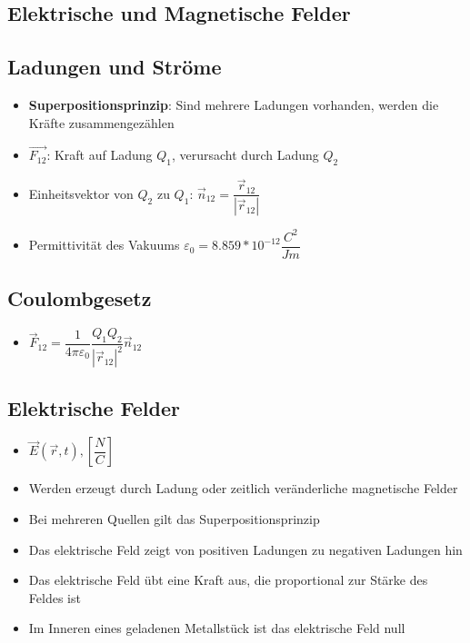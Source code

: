 \documentclass[8pt,a4paper]{scrartcl}
\begin{document}
\begin{multicols*}{3}
		\section{Elektrische und Magnetische Felder}

			\subsection{Ladungen und Ströme}
				\begin{itemize}\itemsep0pt
					\item \textbf{Superpositionsprinzip}: Sind mehrere Ladungen vorhanden, werden die Kräfte zusammengezählen
					\item $\overrightarrow{F_{12}}$: Kraft auf Ladung $Q_{1}$, verursacht durch Ladung $Q_{2}$
					\item Einheitsvektor von $Q_{2}$ zu $Q_{1}$: $\overrightarrow{n}_{12} = \dfrac{\overrightarrow{r}_{12}}{|\overrightarrow{r}_{12}|}$
					\item Permittivität des Vakuums $ \varepsilon_{0}=8.859*10^{-12}\dfrac{C^{2}}{Jm}$
				\end{itemize}
			
			\subsection{Coulombgesetz}
				\begin{itemize}\itemsep0pt
					\item $\overrightarrow{F}_{12}=\dfrac{1}{4\pi\varepsilon_{0}}\dfrac{Q_{1}Q_{2}}{|\overrightarrow{r}_{12}|^{2}}\overrightarrow{n}_{12}$
				\end{itemize}
			
			\subsection{Elektrische Felder}
			
				\begin{itemize}\itemsep0pt
					\item $\overrightarrow{E}(\overrightarrow{r},t), [\dfrac{N}{C}]$
					\item Werden erzeugt durch Ladung oder zeitlich veränderliche magnetische Felder
					\item Bei mehreren Quellen gilt das Superpositionsprinzip
					\item Das elektrische Feld zeigt von positiven Ladungen zu negativen Ladungen hin
					\item Das elektrische Feld übt eine Kraft aus, die proportional zur Stärke des Feldes ist
					\item Im Inneren eines geladenen Metallstück ist das elektrische Feld null
				\end{itemize}
			

\end{multicols*}
\end{document}
